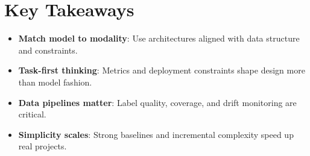 
\section*{Key Takeaways}

\begin{itemize}[leftmargin=2em]
    \item \textbf{Match model to modality}: Use architectures aligned with data structure and constraints.
    \item \textbf{Task-first thinking}: Metrics and deployment constraints shape design more than model fashion.
    \item \textbf{Data pipelines matter}: Label quality, coverage, and drift monitoring are critical.
    \item \textbf{Simplicity scales}: Strong baselines and incremental complexity speed up real projects.
\end{itemize}


